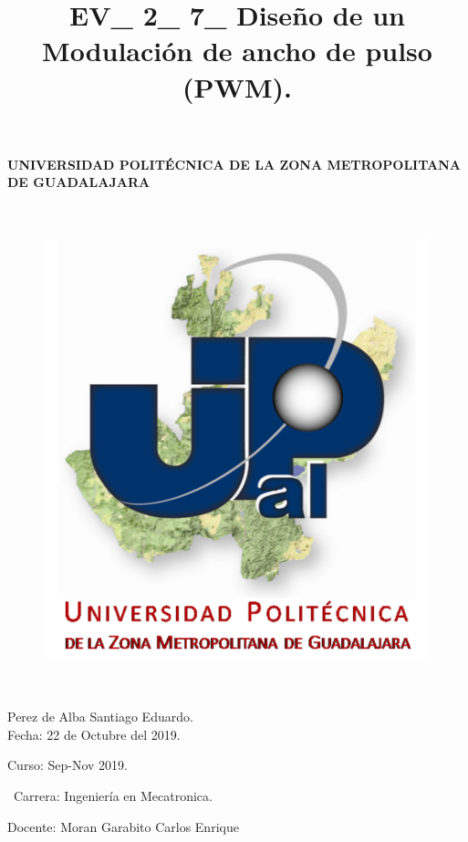 \documentclass[12pt,letterpaper]{article}
\title{EV\_ 2\_ 7\_ Diseño de un Modulación de ancho de pulso (PWM).}
\begin{document}
\maketitle




\paragraph{ UNIVERSIDAD POLITÉCNICA DE LA ZONA METROPOLITANA DE GUADALAJARA}

\
\begin{figure}[h!]
\begin{center}

\includegraphics[scale=0.8]{Upzmg.png} 
\label{Upzmg}


\end{center}
\end{figure}


\

\large{Perez de Alba Santiago Eduardo.\\
Fecha: 22 de Octubre del 2019.
\

Curso: Sep-Nov 2019.

\
Carrera: Ingeniería en Mecatronica.\

Docente: Moran Garabito Carlos Enrique}

\newpage
\end{document}
